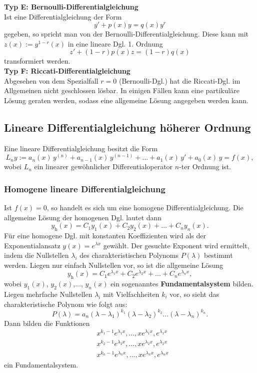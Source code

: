 \noindent
\textbf{Typ E: Bernoulli-Differentialgleichung}\\
Ist eine Differentialgleichung der Form
$$
y' + p(x)y = q(x) y^r
$$
gegeben, so spricht man von der Bernoulli-Differentialgleichung.
Diese kann mit $z(x):= y^{1-r}(x)$ in eine lineare Dgl. 1. Ordnung 
$$
z' +(1-r)p(x)z = (1-r)q(x)
$$
transformiert werden.  \\


\noindent
\textbf{Typ F: Riccati-Differentialgleichung}\\
Abgesehen von dem Spezialfall $r=0$ (Bernoulli-Dgl.) hat die Riccati-Dgl. im Allgemeinen nicht geschlossen l\"osbar. In einigen F\"allen kann eine partikul\"are L\"osung geraten werden, sodass eine allgemeine L\"osung angegeben werden kann. \\


\newpage
\subsection*{Lineare Differentialgleichung h\"oherer Ordnung}
Eine lineare Differentialgleichung besitzt die Form
$$
L_n y :=a_n(x)\, y^{(n)} + a_{n-1}(x)\, y^{(n-1)} + \dots + a_1(x)\, y' + a_0(x)\, y = f(x),
$$
wobei $L_n$ ein linearer gew\"ohnlicher Differentialoperator $n$-ter Ordnung ist.  \\


\subsubsection*{Homogene lineare Differentialgleichung}
Ist $f(x) = 0$, so handelt es sich um eine homogene Differentialgleichung.
Die allgemeine L\"osung der homogenen Dgl. lautet dann
$$
y_{\text{h}}(x) = C_1  y_1(x) + C_2 y_2(x) + ... + C_n y_n(x).
$$
F\"ur eine homogene Dgl. mit konstanten Koeffizienten wird als der Exponentialansatz $y(x) = e^{\lambda x }$ gew\"ahlt. Der gesuchte Exponent wird ermittelt, indem die Nullstellen $\lambda_i$ des charakteristischen Polynoms $P(\lambda)$ bestimmt werden. 
Liegen nur einfach Nullstellen vor, so ist die allgemeine L\"osung
$$
 y_{\text{h}}(x) = C_1  e^{\lambda_1 x} + C_2 e^{\lambda_2 x}  + ... + C_n e^{\lambda_n x},
$$
wobei $y_1(x)$, $y_2(x)$,..., $y_n(x)$ ein sogenanntes \textbf{Fundamentalsystem} bilden. \\
Liegen mehrfache Nullstellen $\lambda_i$ mit Vielfachheiten $k_i$ vor, so sieht das charakteristische Polynom wie folgt aus:
$$
P(\lambda) = a_n (\lambda-\lambda_1)^{k_1}(\lambda-\lambda_2)^{k_2}...(\lambda-\lambda_n)^{k_n}.
$$
Dann bilden die Funktionen
\begin{align*}
& x^{k_1-1}e^{\lambda_1x}, ..., xe^{\lambda_1x}, e^{\lambda_1x} \\
& x^{k_2-1}e^{\lambda_2x}, ..., xe^{\lambda_2x}, e^{\lambda_2x} \\
& x^{k_n-1}e^{\lambda_nx}, ..., xe^{\lambda_nx}, e^{\lambda_nx}
\end{align*}
ein Fundamentalsystem.\\


